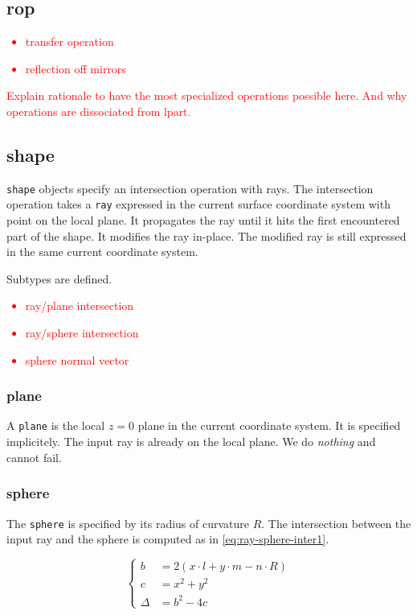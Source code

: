 \subsection{rop}

\textcolor{red}{
\begin{itemize}
\item transfer operation
\item reflection off mirrors
\end{itemize}
Explain rationale to have the most specialized operations possible here.
And why operations are dissociated from lpart.}

\subsection{shape}
\lstinline{shape} objects specify an intersection operation with rays.
The intersection operation takes a \lstinline{ray} expressed in the current
surface coordinate system with point on the local plane. It propagates
the ray until it hits the first encountered part of the shape. It modifies
the ray in-place. The modified ray is still expressed in the same current
coordinate system.

Subtypes are defined.

\textcolor{red}{\begin{itemize}
\item ray/plane intersection
\item ray/sphere intersection
\item sphere normal vector
\end{itemize}}

\subsubsection{plane}
A \lstinline{plane} is the local $z=0$ plane in the current coordinate system.
It is specified implicitely.  The input ray is already on the local plane. We
do \emph{nothing} and cannot fail.

\subsubsection{sphere}
The \lstinline{sphere} is specified by its radius of curvature $R$.
The intersection between the input ray and the sphere is computed as
in \cref{eq:ray-sphere-inter1}.

\begin{equation} \label{eq:ray-sphere-inter1}
\begin{cases}
b &= 2 (x \cdot l + y \cdot m - n \cdot R) \\
c &= x^2 + y^2 \\
\Delta &= b^2 - 4 c
\end{cases}
\end{equation}

